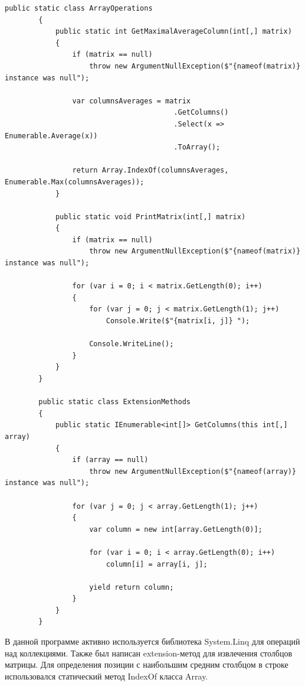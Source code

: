 \documentclass[a4paper,14pt]{extarticle}
\begin{document}
    \begin{lstlisting}[language={[Sharp]C}]
        public static class ArrayOperations
        {
            public static int GetMaximalAverageColumn(int[,] matrix)
            {
                if (matrix == null) 
                    throw new ArgumentNullException($"{nameof(matrix)} instance was null");

                var columnsAverages = matrix
                                        .GetColumns()
                                        .Select(x => Enumerable.Average(x))
                                        .ToArray();

                return Array.IndexOf(columnsAverages, Enumerable.Max(columnsAverages));
            }

            public static void PrintMatrix(int[,] matrix)
            {
                if (matrix == null) 
                    throw new ArgumentNullException($"{nameof(matrix)} instance was null");

                for (var i = 0; i < matrix.GetLength(0); i++)
                {
                    for (var j = 0; j < matrix.GetLength(1); j++)
                        Console.Write($"{matrix[i, j]} ");

                    Console.WriteLine();
                }
            }
        }

        public static class ExtensionMethods
        {
            public static IEnumerable<int[]> GetColumns(this int[,] array)
            {
                if (array == null) 
                    throw new ArgumentNullException($"{nameof(array)} instance was null");

                for (var j = 0; j < array.GetLength(1); j++)
                {
                    var column = new int[array.GetLength(0)];
                    
                    for (var i = 0; i < array.GetLength(0); i++)
                        column[i] = array[i, j];

                    yield return column;
                }
            }
        }
    \end{lstlisting}

    В данной программе активно используется библиотека System.Linq для операций
    над коллекциями. Также был написан extension-метод для извлечения столбцов
    матрицы. Для определения позиции с наибольшим средним столбцом в строке
    использовался статический метод IndexOf класса Array.
\end{document}
